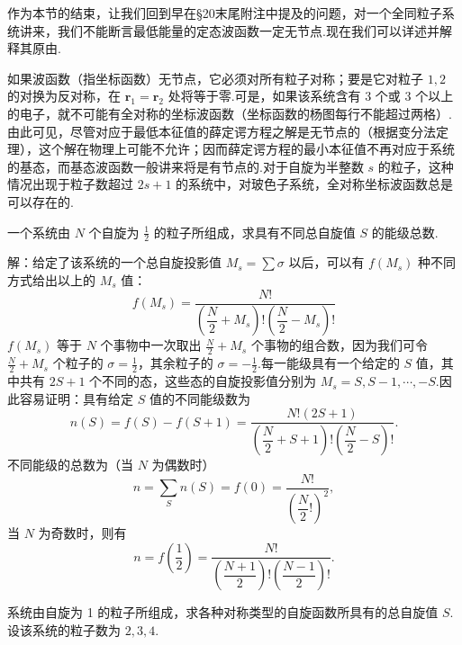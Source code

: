 作为本节的结束，让我们回到早在§20末尾附注中提及的问题，对一个全同粒子系统讲来，我们不能断言最低能量的定态波函数一定无节点.现在我们可以详述并解释其原由.

如果波函数（指坐标函数）无节点，它必须对所有粒子对称；要是它对粒子 $1,2$ 的对换为反对称，在 $\boldsymbol{r}_1=\boldsymbol{r}_2$ 处将等于零.可是，如果该系统含有 3 个或 3 个以上的电子，就不可能有全对称的坐标波函数（坐标函数的杨图每行不能超过两格）.由此可见，尽管对应于最低本征值的薛定谔方程之解是无节点的（根据变分法定理），这个解在物理上可能不允许；因而薛定谔方程的最小本征值不再对应于系统的基态，而基态波函数一般讲来将是有节点的.对于自旋为半整数 $s$ 的粒子，这种情况出现于粒子数超过 $2s+1$ 的系统中，对玻色子系统，全对称坐标波函数总是可以存在的.

\begin{xiti}

\quad 一个系统由 $N$ 个自旋为 $\frac{1}{2}$ 的粒子所组成，求具有不同总自旋值 $S$ 的能级总数.

解：给定了该系统的一个总自旋投影值 $M_s=\sum\sigma$ 以后，可以有 $f(M_s)$ 种不同方式给出以上的 $M_s$ 值：
\begin{equation*}
  f(M_s)=\frac{N!}{\left(\dfrac{N}{2}+M_s\right)!\left(\dfrac{N}{2}-M_s\right)!}
\end{equation*}
$f(M_s)$ 等于 $N$ 个事物中一次取出 $\frac{N}{2}+M_s$ 个事物的组合数，因为我们可令 $\frac{N}{2}+M_s$ 个粒子的 $\sigma=\frac{1}{2}$，其余粒子的 $\sigma=-\frac{1}{2}$.每一能级具有一个给定的 $S$ 值，其中共有 $2S+1$ 个不同的态，这些态的自旋投影值分别为 $M_s=S,S-1,\cdots,-S$.因此容易证明：具有给定 $S$ 值的不同能级数为
\begin{equation*}
  n(S)=f(S)-f(S+1)=\frac{N!\left(2S+1\right)}{\left(\dfrac{N}{2}+S+1\right)!\left(\dfrac{N}{2}-S\right)!}.
\end{equation*}
不同能级的总数为（当 $N$ 为偶数时）
\begin{equation*}
  n=\sum_S n(S)=f(0)=\frac{N!}{\left(\dfrac{N}{2}!\right)^2},
\end{equation*}
当 $N$ 为奇数时，则有
\begin{equation*}
  n=f\left(\frac{1}{2}\right)=\frac{N!}{\left(\dfrac{N+1}{2}\right)!\left(\dfrac{N-1}{2}\right)!}.
\end{equation*}

\quad 系统由自旋为 1 的粒子所组成，求各种对称类型的自旋函数所具有的总自旋值 $S$.设该系统的粒子数为 $2,3,4$.


\end{xiti}

